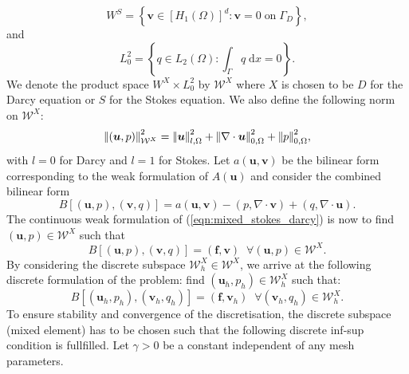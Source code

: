\begin{equation*}
W^{S}=\left\lbrace \boldsymbol{v} \in [H_{1}(\Omega)]^{d}: \boldsymbol{v} = 0 \; \mbox{on} \; \Gamma_{D} \right\rbrace,
\end{equation*}
and 
\begin{equation*}
L^{2}_{0}=\left\lbrace q \in L_{2}(\Omega): \int_{\Gamma} q \; \mbox{d}x=0 \right\rbrace.
\end{equation*}
We denote the product space $W^{X} \times L^{2}_{0}$ by $\mathcal{W}^{X}$ where $X$ is chosen to be $D$ for the Darcy equation or $S$ for the Stokes equation. We also define the following norm on $\mathcal{W}^{X}$:
\begin{equation*}
{\left\vert\kern-0.25ex\left\vert (\boldsymbol{u},p) \right\vert\kern-0.25ex\right\vert}_{\mathcal{W}^{X}}^{2}={\left\vert\kern-0.25ex\left\vert \boldsymbol{u} \right\vert\kern-0.25ex\right\vert}_{l,\Omega}^{2}+{\left\vert\kern-0.25ex\left\vert \nabla \cdot \boldsymbol{u} \right\vert\kern-0.25ex\right\vert}_{0,\Omega}^{2}+{\left\vert\kern-0.25ex\left\vert p \right\vert\kern-0.25ex\right\vert}_{0,\Omega}^{2},
\end{equation*}
with $l=0$ for Darcy and $l=1$ for Stokes. Let $a(\boldsymbol{u},\boldsymbol{v})$ be the bilinear form corresponding to the weak formulation of $A(\boldsymbol{u})$ and consider the combined bilinear form
\begin{equation*}
B[(\boldsymbol{u},p),(\boldsymbol{v},q)]=a(\boldsymbol{u},\boldsymbol{v})-(p,\nabla \cdot \boldsymbol{v}) + (q,\nabla \cdot \boldsymbol{u}).
\end{equation*}
The continuous weak formulation of (\ref{eqn:mixed_stokes_darcy}) is now to find $(\boldsymbol{u},p) \in \mathcal{W}^{X}$ such that
%
\begin{equation*}
B[(\boldsymbol{u},p),(\boldsymbol{v},q)]= (\boldsymbol{f},\boldsymbol{v}) \;\; \forall (\boldsymbol{u},p) \in \mathcal{W}^{X}.
\end{equation*}
%
By considering the discrete subspace $\mathcal{W}^{X}_{h} \in \mathcal{W}^{X}$, we arrive at the following discrete formulation of the problem: find $(\boldsymbol{u}_{h},p_{h})\in \mathcal{W}^{X}_{h}$ such that:
%
\begin{equation*}
B[(\boldsymbol{u}_{h},p_{h}),(\boldsymbol{v}_{h},q_{h})]= (\boldsymbol{f},\boldsymbol{v}_{h}) \;\; \forall (\boldsymbol{v}_{h},q_{h}) \in \mathcal{W}^{X}_{h}.
\label{eqn:mixed_disc}
\end{equation*}
%
%
%
%
To ensure stability and convergence of the discretisation, the discrete subspace (mixed element) has to be chosen such that the following discrete inf-sup condition \citep{babuvska1971error} is fullfilled. Let $\gamma>0$ be a constant independent of any mesh parameters.  
